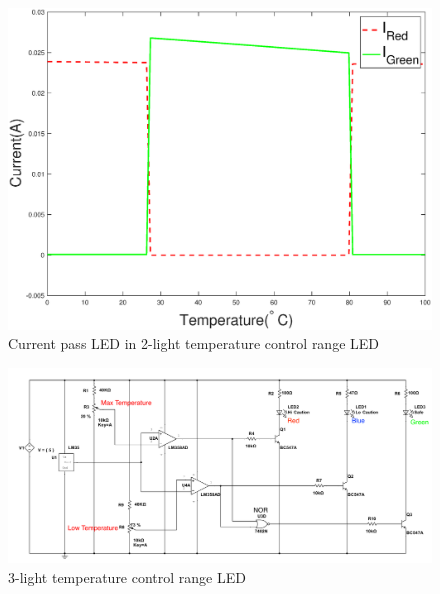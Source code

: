 \documentclass[12pt]{article}
\numberwithin{equation}{section}
\begin{document}

\begin{figure}[H] %
\centering %
\includegraphics[width=\textwidth]{2led_range_diagram} %
\caption{Current pass LED in 2-light temperature control range LED} %
\label{Fig.2light_diagram} %
\end{figure}





\begin{figure}[H] %
\centering %
\includegraphics[width=\textwidth]{3light_range} %
\caption{3-light temperature control range LED} %
\label{Fig.3light} %
\end{figure}
\end{document}
